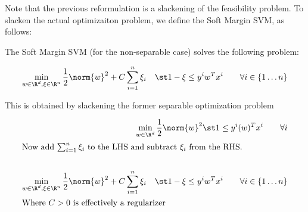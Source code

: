 \documentclass[../main.tex]{subfiles}
\begin{document}
\begin{remark}
    Note that the previous reformulation is a slackening of the feasibility problem. To slacken the actual optimizaiton problem, we define the Soft Margin SVM, as follows:
\end{remark}

\begin{definition}
    The Soft Margin SVM (for the non-separable case) solves the following problem:

    \[
        \min_{w \in \R^d, \xi \in \R^n} \frac{1}{2}\norm{w}^2 + C\sum_{i=1}^{n}\xi_{i} \quad \st 1 - \xi \leq y^{i}w^Tx^{i} \qquad \forall i \in \{1 \dots n\}
    \]

    This is obtained by slackening the former separable optimization problem

    \begin{align*}
        \min_{w \in \R^d}  \frac{1}{2}\norm{w}^2 \st 1 \leq y^{i}(w)^Tx^{i}  \qquad \forall i \\
        \intertext{Now add $\sum_{i=1}^{n}\xi_{i}$ to the LHS and subtract $\xi_{i}$ from the RHS.} \\
        \min_{w \in \R^d, \xi \in \R^n} \frac{1}{2}\norm{w}^2 + C\sum_{i=1}^{n}\xi_{i} \quad \st 1 - \xi \leq y^{i}w^Tx^{i} \qquad \forall i \in \{1 \dots n\} \\
        \intertext{Where $C > 0$ is effectively a regularizer} \\
    \end{align*}

\end{definition}
\end{document}
